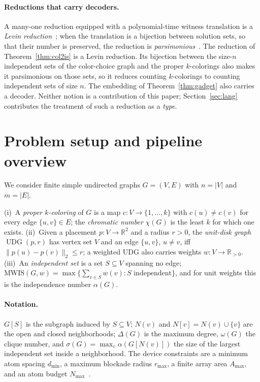 \documentclass[a4paper,fleqn]{cas-sc}
\newcommand{\UDG}{\operatorname{UDG}}
\newcommand{\MWIS}{\mathrm{MWIS}}
\newcommand{\R}{\mathbb{R}}
\newcommand{\indep}{\alpha}
\newcommand{\Nmax}{N_{\max}}
\begin{document}
\paragraph{Reductions that carry decoders.}
\label{sec:bg-levin}
A many-one reduction equipped with a polynomial-time witness translation is a
\emph{Levin reduction}~\cite{Levin1973}; when the translation is a bijection between
solution sets, so that their number is preserved, the reduction is
\emph{parsimonious}~\cite{Simon1975,Valiant1979}. The reduction of
Theorem~\ref{thm:col2is} is a Levin reduction. Its bijection between the size-$n$
independent sets of the color-choice graph and the proper $k$-colorings also makes it
parsimonious on those sets, so it reduces counting $k$-colorings to counting
independent sets of size $n$. The embedding of Theorem~\ref{thm:gadget} also carries
a decoder. Neither notion is a contribution of this paper; Section~\ref{sec:lang}
contributes the treatment of such a reduction as a \emph{type}.

\section{Problem setup and pipeline overview}
\label{sec:overview}

We consider finite simple undirected graphs $G=(V,E)$ with $n=|V|$ and $m=|E|$.

\begin{definition}
\label{def:coloring}
(i)~A \emph{proper $k$-coloring} of $G$ is a map $c:V\to\{1,\dots,k\}$ with
$c(u)\ne c(v)$ for every edge $\{u,v\}\in E$; the \emph{chromatic number} $\chi(G)$
is the least $k$ for which one exists.
(ii)~Given a placement $p:V\to\R^2$ and a radius $r>0$, the \emph{unit-disk graph}
$\UDG(p,r)$ has vertex set $V$ and an edge $\{u,v\}$, $u\ne v$, iff
$\lVert p(u)-p(v)\rVert_2\le r$; a weighted UDG also carries weights
$w:V\to\R_{>0}$.
(iii)~An \emph{independent set} is a set $S\subseteq V$ spanning no edge;
$\MWIS(G,w)=\max\{\sum_{v\in S}w(v):S\text{ independent}\}$, and for unit weights this
is the independence number $\indep(G)$.
\end{definition}

\paragraph{Notation.} $G[S]$ is the subgraph induced by $S\subseteq V$; $N(v)$ and
$N[v]=N(v)\cup\{v\}$ are the open and closed neighborhoods; $\Delta(G)$ is the maximum
degree, $\omega(G)$ the clique number, and $\sigma(G)=\max_{v}\indep(G[N(v)])$ the size of
the largest independent set inside a neighborhood. The device constraints are a minimum atom spacing
$d_{\min}$, a maximum blockade radius $r_{\max}$, a finite array area $A_{\max}$, and
an atom budget $\Nmax$~\cite{Wurtz2023}.
\end{document}
